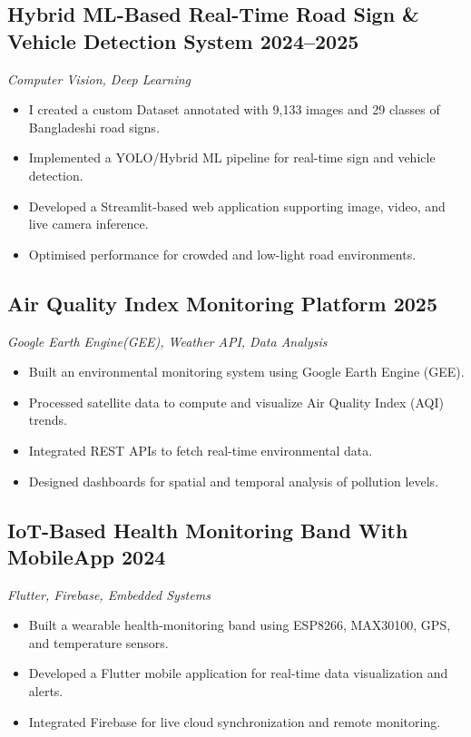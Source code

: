 \subsection{Hybrid ML-Based Real-Time Road Sign \& Vehicle Detection System \hfill 2024--2025}
\textit{Computer Vision, Deep Learning}
\begin{itemize}
  \item I created a custom Dataset annotated with 9,133 images and 29 classes of Bangladeshi road signs.
  \item Implemented a YOLO/Hybrid ML pipeline for real-time sign and vehicle detection.
  \item Developed a Streamlit-based web application supporting image, video, and live camera inference.
  \item Optimised performance for crowded and low-light road environments.
\end{itemize}

\subsection{Air Quality Index Monitoring Platform \hfill 2025}
\textit{Google Earth Engine(GEE), Weather API, Data Analysis}
\begin{itemize}
  \item Built an environmental monitoring system using Google Earth Engine (GEE).
  \item Processed satellite data to compute and visualize Air Quality Index (AQI) trends.
  \item Integrated REST APIs to fetch real-time environmental data.
  \item Designed dashboards for spatial and temporal analysis of pollution levels.
\end{itemize}

\subsection{IoT-Based Health Monitoring Band With MobileApp \hfill 2024}
\textit{Flutter, Firebase, Embedded Systems}
\begin{itemize}
  \item Built a wearable health-monitoring band using ESP8266, MAX30100, GPS, and temperature sensors.
  \item Developed a Flutter mobile application for real-time data visualization and alerts.
  \item Integrated Firebase for live cloud synchronization and remote monitoring.
\end{itemize}

